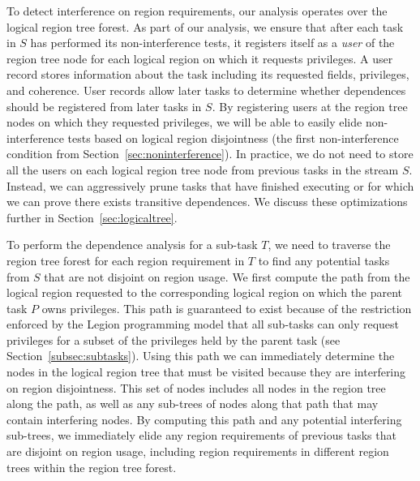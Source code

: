 To detect interference on region requirements,
our analysis operates over the logical region 
tree forest. As part of our analysis, we ensure 
that after each task in $S$ has performed its
non-interference tests, it registers itself as a
{\em user} of the region tree node for each logical
region on which it requests privileges. A user 
record stores information about the task including
its requested fields, privileges, and coherence.
User records allow later tasks to determine whether
dependences should be registered from later tasks
in $S$. By registering users at the region tree 
nodes on which they requested privileges, we will
be able to easily elide non-interference tests based
on logical region disjointness (the first 
non-interference condition from 
Section~\ref{sec:noninterference}). In practice,
we do not need to store all the users on each logical
region tree node from previous tasks in the 
stream $S$. Instead, we can aggressively prune tasks 
that have finished executing or for which we can prove 
there exists transitive dependences.  We discuss these 
optimizations further in Section~\ref{sec:logicaltree}.

To perform the dependence analysis for a sub-task $T$,
we need to traverse the region tree forest for each region
requirement in $T$ to find any potential tasks from 
$S$ that are not disjoint on region usage. We first
compute the path from the logical region requested
to the corresponding logical region on which the 
parent task $P$ owns privileges. This path is 
guaranteed to exist because of the restriction 
enforced by the Legion programming model that 
all sub-tasks can only request privileges for 
a subset of the privileges held by the parent task 
(see Section~\ref{subsec:subtasks}). Using this
path we can immediately determine the nodes in the
logical region tree that must be visited because
they are interfering on region disjointness. This
set of nodes includes all nodes in the region tree
along the path, as well as any sub-trees of nodes
along that path that may contain interfering nodes.
By computing this path and any potential interfering
sub-trees, we immediately elide any region requirements
of previous tasks that are disjoint on region usage,
including region requirements in different region
trees within the region tree forest.

